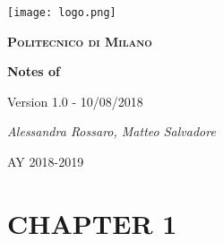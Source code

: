 \documentclass[11pt, a4paper, draft]{report}
\begin{document}
	\begin{titlepage}
		\centering
		\texttt{[image: logo.png]}\par\vspace{1cm}
		{\scshape\LARGE\bfseries Politecnico di Milano \par}
		\vspace{2cm}
		{\scshape\Large \par}
		\vspace{1.5cm}
		{\Huge\bfseries Notes of \par}
		\vspace{1cm}
		{\small Version 1.0 - 10/08/2018\par}
		\vspace{1cm}
		{\Large\itshape Alessandra Rossaro, Matteo Salvadore\par}

		\vfill

		{\large AY 2018-2019\par}
	\end{titlepage}

	\tableofcontents{}

	\listoftodos[Notes]

	\chapter{CHAPTER 1}
	\label{ch:CHAPTER_ONE}
		\begin{comment}
			
		\end{comment}
			\lipsum
\end{document}
